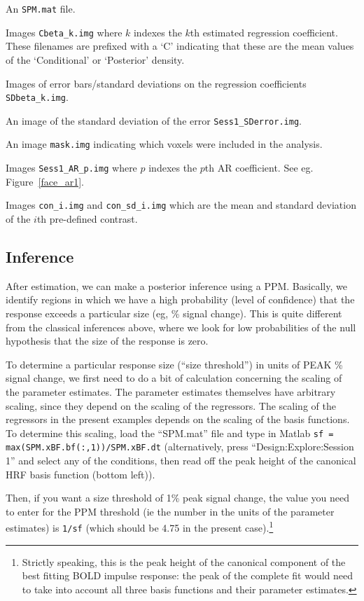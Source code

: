 \bi
\item{An \verb!SPM.mat! file.}
\item{Images   \verb!Cbeta_k.img! where $k$ indexes the $k$th estimated regression coefficient. These filenames are prefixed with a `C' indicating that these
are the mean values of the `Conditional' or `Posterior' density.}
\item{Images of error bars/standard deviations on the regression coefficients \verb!SDbeta_k.img!.}
\item{An image of the standard deviation of the 
error \verb!Sess1_SDerror.img!.}
\item{An image \verb!mask.img! indicating which voxels 
were included in the analysis.}
\item{Images \verb!Sess1_AR_p.img! where $p$ indexes the $p$th AR coefficient. See eg. Figure~\ref{face_ar1}.}
\item{Images \verb!con_i.img! and \verb!con_sd_i.img! which are the mean and standard deviation of the $i$th pre-defined contrast.} 
\ei

\subsection{Inference}

After estimation, we can make a posterior inference using a PPM. Basically, we identify regions in which we have a high probability (level of confidence) that the response exceeds a particular size (eg, \% signal change). This is quite different from the classical inferences above, where we look for low probabilities of the null hypothesis that the size of the response is zero.

To determine a particular response size (``size threshold'') in units of PEAK \% signal change, we first need to do a bit of calculation concerning the scaling of the parameter estimates. The parameter estimates themselves have arbitrary scaling, since they depend on the scaling of the regressors. The scaling of the regressors in the present examples depends on the scaling of the basis functions. To determine this scaling, load the ``SPM.mat'' file and type in Matlab \verb!sf = max(SPM.xBF.bf(:,1))/SPM.xBF.dt! (alternatively, press ``Design:Explore:Session 1'' and select any of the conditions, then read off the peak height of the canonical HRF basis function (bottom left)).

Then, if you want a size threshold of 1\% peak signal change, the value you need to enter for the PPM threshold (ie the number in the units of the parameter estimates) is \verb!1/sf! (which should be 4.75 in the present case).\footnote{Strictly speaking, this is the peak height of the canonical component of the best fitting BOLD impulse response: the peak of the complete fit would need to take into account all three basis functions and their parameter estimates.}

